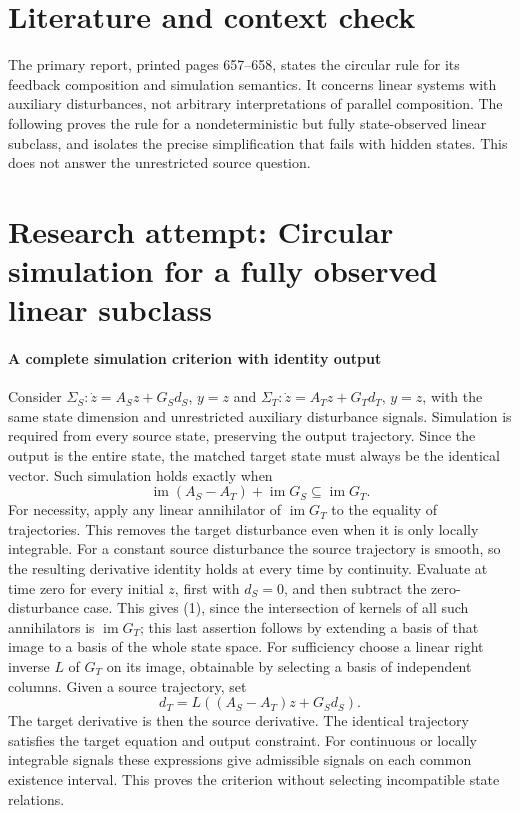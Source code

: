 \documentclass[11pt]{article}
\begin{document}
\section{Literature and context check}
The primary report, printed pages 657--658, states the circular rule for its feedback composition and simulation semantics. It concerns linear systems with auxiliary disturbances, not arbitrary interpretations of parallel composition. The following proves the rule for a nondeterministic but fully state-observed linear subclass, and isolates the precise simplification that fails with hidden states. This does not answer the unrestricted source question.
\section{Research attempt: Circular simulation for a fully observed linear subclass}

\paragraph{A complete simulation criterion with identity output}
Consider $\Sigma_S:\dot z=A_Sz+G_Sd_S$, $y=z$ and $\Sigma_T:\dot z=A_Tz+G_Td_T$, $y=z$, with the same state dimension and unrestricted auxiliary disturbance signals. Simulation is required from every source state, preserving the output trajectory. Since the output is the entire state, the matched target state must always be the identical vector. Such simulation holds exactly when
\[
 \operatorname{im}(A_S-A_T)+\operatorname{im}G_S\subseteq\operatorname{im}G_T.
 \tag{1}
\]
For necessity, apply any linear annihilator of $\operatorname{im}G_T$ to the equality of trajectories. This removes the target disturbance even when it is only locally integrable. For a constant source disturbance the source trajectory is smooth, so the resulting derivative identity holds at every time by continuity. Evaluate at time zero for every initial $z$, first with $d_S=0$, and then subtract the zero-disturbance case. This gives (1), since the intersection of kernels of all such annihilators is $\operatorname{im}G_T$; this last assertion follows by extending a basis of that image to a basis of the whole state space. For sufficiency choose a linear right inverse $L$ of $G_T$ on its image, obtainable by selecting a basis of independent columns. Given a source trajectory, set
\[
 d_T=L((A_S-A_T)z+G_Sd_S).
\]
The target derivative is then the source derivative. The identical trajectory satisfies the target equation and output constraint. For continuous or locally integrable signals these expressions give admissible signals on each common existence interval. This proves the criterion without selecting incompatible state relations.
\end{document}
